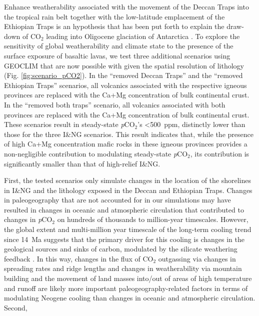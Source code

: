 \documentclass[11pt,letterpaper]{article}
\newcommand{\pCOtwo}{\textit{p}CO$_{2}$\xspace}
\newcommand{\COtwo}{CO$_{2}$\xspace}
\begin{document}
Enhance weatherability associated with the movement of the Deccan Traps into the tropical rain belt together with the low-latitude emplacement of the Ethiopian Traps is an hypothesis that has been put forth to explain the draw-down of \COtwo leading into Oligocene glaciation of Antarctica \citep{Kent2008a, Kent2013a}. To explore the sensitivity of global weatherability and climate state to the presence of the surface exposure of basaltic lavas, we test three additional scenarios using GEOCLIM that are now possible with given the spatial resolution of lithology (Fig. \ref{fig:scenario_pCO2}). In the ``removed Deccan Traps'' and the ``removed Ethiopian Traps'' scenarios, all volcanics associated with the respective igneous provinces are replaced with the Ca+Mg concentration of bulk continental crust. In the ``removed both traps'' scenario, all volcanics associated with both provinces are replaced with the Ca+Mg concentration of bulk continental crust. These scenarios result in steady-state \pCOtwo's \textless500~ppm, distinctly lower than those for the three I\&NG scenarios. This result indicates that, while the presence of high Ca+Mg concentration mafic rocks in these igneous provinces provides a non-negligible contribution to modulating steady-state \pCOtwo, its contribution is significantly smaller than that of high-relief I\&NG.

First, the tested scenarios only simulate changes in the location of the shorelines in I\&NG and the lithology exposed in the Deccan and Ethiopian Traps. Changes in paleogeography that are not accounted for in our simulations may have resulted in changes in oceanic and atmospheric circulation \citep{Haug1998a, Shevenell2004a, Holbourn2015a, Molnar2015a} that contributed to changes in \pCOtwo on hundreds of thousands to million-year timescales. However, the global extent and multi-million year timescale of the long-term cooling trend since 14~Ma suggests that the primary driver for this cooling is changes in the geological sources and sinks of carbon, modulated by the silicate weathering feedback \citep{Walker1981a, Raymo1991a, Berner1997a, Kump1997a, Berner2001a}. In this way, changes in the flux of \COtwo outgassing via changes in spreading rates and ridge lengths \citep{Rowan2016a} and changes in weatherability via mountain building and the movement of land masses into/out of areas of high temperature and runoff are likely more important paleogeography-related factors in terms of modulating Neogene cooling than changes in oceanic and atmospheric circulation. Second, 
\end{document}
